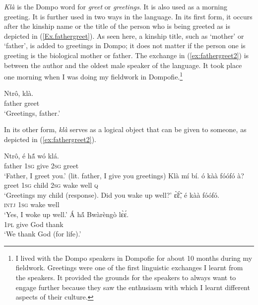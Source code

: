 \documentclass[output=paper,colorlinks,citecolor=brown]{langscibook}
\begin{document}
\textit{Klà} is the Dompo word for \textit{greet} or \textit{greetings}. It is also used as a morning greeting. It is further used in two ways in the language. In its first form, it occurs after the kinship name or the title of the person who is being greeted as is depicted in (\ref{Ex.fathergreet}). As seen here, a kinship title, such as `mother' or `father', is added to greetings in Dompo; it does not matter if the person one is greeting is the biological mother or father. The exchange in (\ref{ex:fathergreet2}) is between the author and the oldest male speaker of the language. It took place one morning when I was doing my fieldwork in Dompofie.\footnote{I lived with the Dompo speakers in Dompofie for about 10 months during my fieldwork. Greetings were one of the first linguistic exchanges I learnt from the speakers. It provided the grounds for the speakers to always want to engage further because they saw the enthusiasm with which I learnt different aspects of their culture.} 

\ea \label{Ex.fathergreet}
\gll Ntrô,	 klà.\\
father	greet\\
\glt  ‘Greetings, father.’
\z

\noindent In its other form, \textit{klà} serves as a logical object that can be given to someone, as depicted in (\ref{ex:fathergreet2}). 

\ea \label{ex:fathergreet2}
\begin{xlist}
\ex 
 \gll Ntrô,	é	hã́	wó	klá.\\
        father	\textsc{1sg}	give	\textsc{2sg}	greet\\
        \glt  ‘Father, I greet you.’ (lit. father, I give you greetings) 
\ex
\gll Klà	mí	bí.	ó	kàà	fóófó	à?\\
        greet	\textsc{1sg}	child	\textsc{2sg}	wake	well	\textsc{q}\\
        \glt  ‘Greetings my child (response). Did you wake up well?’ 
\ex 
 \gll ɛ̃̀ɛ̃́,	é	kàà	fóófó.\\
\textsc{intj}	\textsc{1sg}	wake	well\\
\glt  ‘Yes, I woke up well.’ 
\ex
\gll Á	hã́	Bwàrèngò	lɛ̀ɛ́.\\
	\textsc{1pl}	give	God		thank\\
\glt  ‘We thank God (for life).’ 
\end{xlist}
\z
\end{document}
